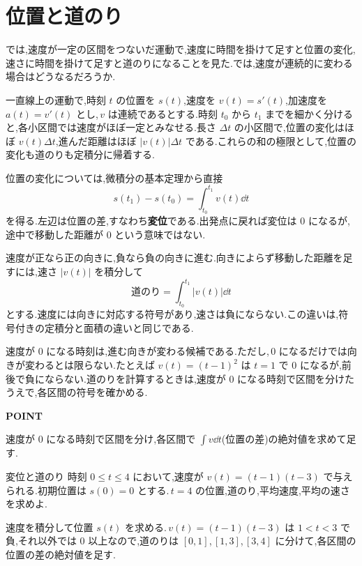 \section{位置と道のり}\label{節:運動と積分}

では,速度が一定の区間をつないだ運動で,速度に時間を掛けて足すと位置の変化,速さに時間を掛けて足すと道のりになることを見た.では,速度が連続的に変わる場合はどうなるだろうか.

一直線上の運動で,時刻 $t$ の位置を $s(t)$,速度を $v(t)=s'(t)$,加速度を $a(t)=v'(t)$ とし,\,$v$ は連続であるとする.時刻 $t_0$ から $t_1$ までを細かく分けると,各小区間では速度がほぼ一定とみなせる.長さ $\Delta t$ の小区間で,位置の変化はほぼ $v(t)\Delta t$,進んだ距離はほぼ $|v(t)|\Delta t$ である.これらの和の極限として,位置の変化も道のりも定積分に帰着する.

位置の変化については,微積分の基本定理から直接
\[
s(t_1)-s(t_0)=\int_{t_0}^{t_1}v(t)\dd t
\]
を得る.左辺は位置の差,すなわち\textbf{変位}である.出発点に戻れば変位は $0$ になるが,途中で移動した距離が $0$ という意味ではない.

速度が正なら正の向きに,負なら負の向きに進む.向きによらず移動した距離を足すには,速さ $|v(t)|$ を積分して
\begin{equation}\label{式:道のり}
\text{道のり}=\int_{t_0}^{t_1}|v(t)|\dd t
\end{equation}
とする.速度には向きに対応する符号があり,速さは負にならない.この違いは,符号付きの定積分と面積の違いと同じである.

速度が $0$ になる時刻は,進む向きが変わる候補である.ただし,\,$0$ になるだけでは向きが変わるとは限らない.たとえば $v(t)=(t-1)^2$ は $t=1$ で $0$ になるが,前後で負にならない.道のりを計算するときは,速度が $0$ になる時刻で区間を分けたうえで,各区間の符号を確かめる.

\begin{bookpoint}
\textbf{POINT}\par
速度が $0$ になる時刻で区間を分け,各区間で $\int v\dd t$(位置の差)の絶対値を求めて足す.
\end{bookpoint}

\begin{example}{変位と道のり}
時刻 $0\le t\le4$ において,速度が $v(t)=(t-1)(t-3)$ で与えられる.初期位置は $s(0)=0$ とする.\,$t=4$ の位置,道のり,平均速度,平均の速さを求めよ.
\end{example}

速度を積分して位置 $s(t)$ を求める.\,$v(t)=(t-1)(t-3)$ は $1<t<3$ で負,それ以外では $0$ 以上なので,道のりは $[0,1]$,\,$[1,3]$,\,$[3,4]$ に分けて,各区間の位置の差の絶対値を足す.

